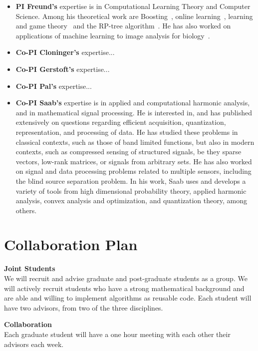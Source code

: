 \documentclass{article}
\begin{document}
\begin{itemize}
\item {\bf PI Freund's} expertise is in Computational Learning Theory and
Computer Science. Among his theoretical work are 
Boosting~\cite{}, online learning~\cite{}, learning and game
theory~\cite{} and the RP-tree algorithm~\cite{}. He has also worked
on applications of machine learning to image analysis for
biology~\cite{}. 
\item {\bf Co-PI Cloninger's} expertise... 
\item {\bf Co-PI Gerstoft's} expertise... 
\item {\bf Co-PI Pal's} expertise... 
\item {\bf Co-PI Saab's} expertise is in applied and computational harmonic analysis, and in mathematical signal processing. He is interested in, and has published extensively on questions regarding efficient acquisition, quantization, representation, and processing of data. He has studied these problems in classical contexts, such as those of band limited functions, but also in modern contexts, such as compressed sensing of structured signals, be they sparse vectors, low-rank matrices, or signals from arbitrary sets. He has also worked on signal and data processing problems related to multiple sensors, including the blind source separation problem. In his work, Saab uses and develops a variety of tools from high dimensional probability theory, applied harmonic analysis, convex analysis and optimization, and quantization theory, among others. 
\end{itemize}

\section{Collaboration Plan}

{\bf Joint Students}\\
We will recruit and advise graduate and post-graduate students as a
group. We will actively recruit students who have a strong
mathematical background and are able and willing to implement
algorithms as reusable code.  Each student will have two advisors,
from two of the three disciplines.

{\bf Collaboration}\\
Each graduate student will have a one hour meeting with each other
their advisors each week.
\end{document}
